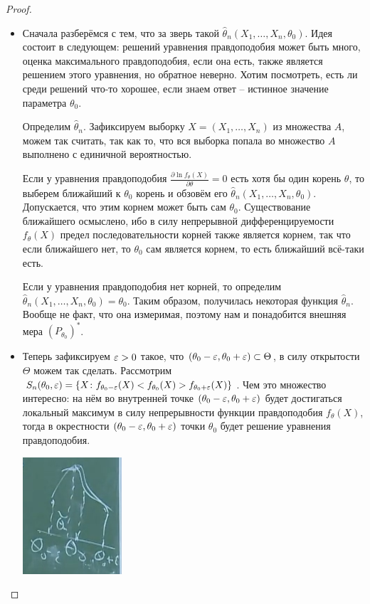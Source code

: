 \begin{proof}~
    \begin{itemize}
        \item Сначала разберёмся с тем, что за зверь такой $\hat{\theta}_n(X_1, \dots, X_n, \theta_0)$. Идея состоит в следующем: решений уравнения правдоподобия может быть много, оценка максимального правдоподобия, если она есть, также является решением этого уравнения, но обратное неверно. Хотим посмотреть, есть ли среди решений что-то хорошее, если знаем ответ -- истинное значение параметра $\theta_0$.

        Определим $\hat{\theta}_n$. Зафиксируем выборку $X = (X_1, \dots, X_n)$ из множества $A$, можем так считать, так как то, что вся выборка попала во множество $A$ выполнено с единичной вероятностью.

        Если у уравнения правдоподобия $\frac{\partial \ln f_\theta(X)}{\partial \theta} = 0$ есть хотя бы один корень $\theta$, то выберем ближайший к $\theta_0$ корень и обзовём его $\hat{\theta}_n(X_1, \dots, X_n, \theta_0)$. Допускается, что этим корнем может быть сам $\theta_0$. Существование ближайшего осмыслено, ибо в силу непрерывной дифференцируемости $f_\theta(X)$ предел последовательности корней также является корнем, так что если ближайшего нет, то $\theta_0$ сам является корнем, то есть ближайший всё-таки есть.

        Если у уравнения правдоподобия нет корней, то определим $\hat{\theta}_n(X_1, \dots, X_n, \theta_0) = \theta_0$. Таким образом, получилась некоторая функция $\hat{\theta}_n$. Вообще не факт, что она измеримая, поэтому нам и понадобится внешняя мера $(P_{\theta_0})^*$.

        \item Теперь зафиксируем $\varepsilon > 0$ такое, что $(\theta_0 - \varepsilon, \theta_0 + \varepsilon) \subset \Theta$, в силу открытости $\Theta$ можем так сделать. Рассмотрим $S_n(\theta_0, \varepsilon) = \{X \colon f_{\theta_0-\varepsilon}(X) < f_{\theta_0}(X) > f_{\theta_0+\varepsilon}(X)\}$. Чем это множество интересно: на нём во внутренней точке $(\theta_0 - \varepsilon, \theta_0 + \varepsilon)$ будет достигаться локальный максимум в силу непрерывности функции правдоподобия $f_\theta(X)$, тогда в окрестности $(\theta_0 - \varepsilon, \theta_0 + \varepsilon)$ точки $\theta_0$ будет решение уравнения правдоподобия.

        \includegraphics{images/picture3.png}


\end{itemize}
\end{proof}
